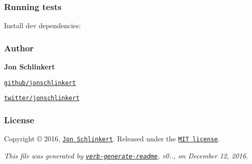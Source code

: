 \subsubsection*{Running tests}

Install dev dependencies\+:




\subsubsection*{Author}

{\bfseries Jon Schlinkert}


\begin{DoxyItemize}
\item \href{https://github.com/jonschlinkert}{\tt github/jonschlinkert}
\item \href{http://twitter.com/jonschlinkert}{\tt twitter/jonschlinkert}
\end{DoxyItemize}

\subsubsection*{License}

Copyright © 2016, \href{https://github.com/jonschlinkert}{\tt Jon Schlinkert}. Released under the \href{https://github.com/jonschlinkert/expand-brackets/blob/master/LICENSE}{\tt M\+IT license}.





{\itshape This file was generated by \href{https://github.com/verbose/verb-generate-readme}{\tt verb-\/generate-\/readme}, v0.., on December 12, 2016.} 